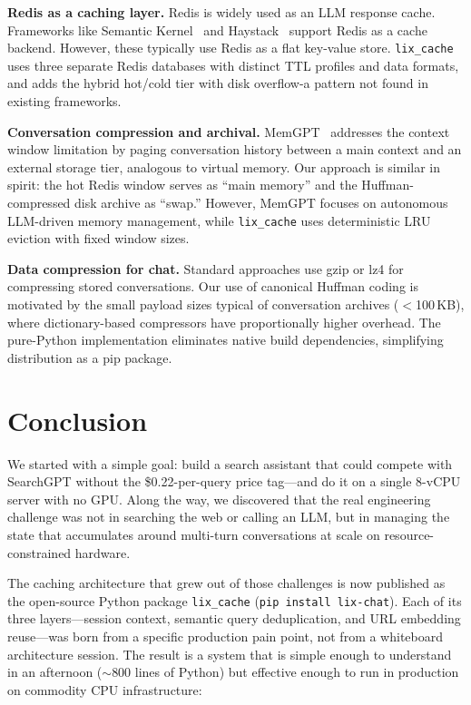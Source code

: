 \documentclass[conference]{IEEEtran}
\begin{document}
\textbf{Redis as a caching layer.}
Redis is widely used as an LLM response cache. Frameworks like Semantic Kernel~\cite{semantic_kernel2023} and Haystack~\cite{haystack2023} support Redis as a cache backend. However, these typically use Redis as a flat key-value store. \texttt{lix\_cache} uses three separate Redis databases with distinct TTL profiles and data formats, and adds the hybrid hot/cold tier with disk overflow-a pattern not found in existing frameworks.

\textbf{Conversation compression and archival.}
MemGPT~\cite{memgpt2023} addresses the context window limitation by paging conversation history between a main context and an external storage tier, analogous to virtual memory. Our approach is similar in spirit: the hot Redis window serves as ``main memory'' and the Huffman-compressed disk archive as ``swap.'' However, MemGPT focuses on autonomous LLM-driven memory management, while \texttt{lix\_cache} uses deterministic LRU eviction with fixed window sizes.

\textbf{Data compression for chat.}
Standard approaches use gzip or lz4 for compressing stored conversations. Our use of canonical Huffman coding is motivated by the small payload sizes typical of conversation archives ($<$100\,KB), where dictionary-based compressors have proportionally higher overhead. The pure-Python implementation eliminates native build dependencies, simplifying distribution as a pip package.

\section{Conclusion}
\label{sec:conclusion}

We started with a simple goal: build a search assistant that could compete with SearchGPT without the \$0.22-per-query price tag---and do it on a single 8-vCPU server with no GPU. Along the way, we discovered that the real engineering challenge was not in searching the web or calling an LLM, but in managing the state that accumulates around multi-turn conversations at scale on resource-constrained hardware.

The caching architecture that grew out of those challenges is now published as the open-source Python package \texttt{lix\_cache} (\texttt{pip install lix-chat}). Each of its three layers---session context, semantic query deduplication, and URL embedding reuse---was born from a specific production pain point, not from a whiteboard architecture session. The result is a system that is simple enough to understand in an afternoon (${\sim}800$ lines of Python) but effective enough to run in production on commodity CPU infrastructure:
\end{document}
